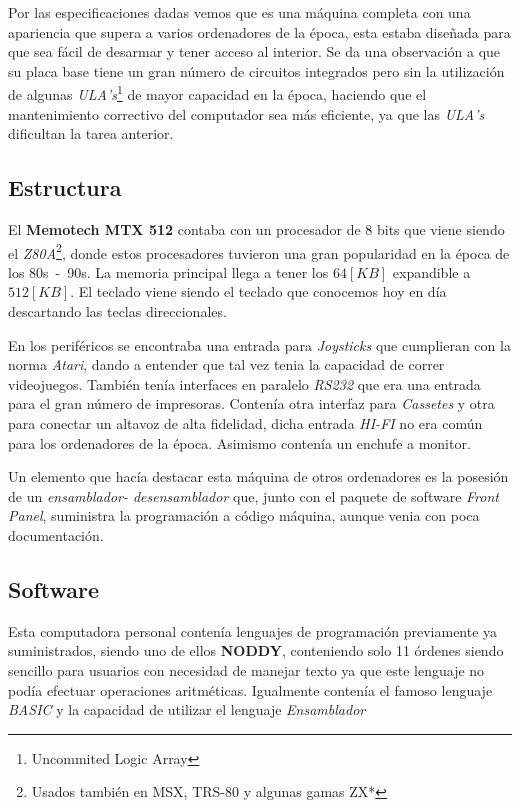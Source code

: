 \documentclass{article}
\begin{document}
\begin{multicols}{2}
Por las especificaciones dadas vemos que es una máquina completa con una apariencia que supera a varios
ordenadores de la época, esta estaba diseñada para que sea fácil de desarmar y tener  acceso al interior.
Se da una observación a que su placa base tiene un gran número de circuitos integrados pero sin la
utilización de algunas \textit{ULA's}\footnote{Uncommited Logic Array} de mayor capacidad en la época,
haciendo que el mantenimiento correctivo del computador sea más eficiente, ya que las \textit{ULA's}
dificultan la tarea anterior.

\subsection{Estructura}

El \textbf{Memotech MTX 512} contaba con un procesador de 8 bits que viene siendo el
\textit{Z80A}\footnote{Usados también en MSX, TRS-80 y algunas gamas ZX*}, donde estos procesadores
tuvieron una gran popularidad en la época de los 80s\ -\ 90s. La memoria principal llega a tener los $64 [KB]$
expandible a $512 [KB]$. El teclado viene siendo el teclado que conocemos hoy en día descartando las teclas
direccionales.

En los periféricos se encontraba una entrada para \textit{Joysticks} que cumplieran con la norma
\textit{Atari}, dando a entender que tal vez tenia la capacidad de correr videojuegos. También tenía interfaces
en paralelo \textit{RS232} que era una entrada para el gran número de impresoras.
Contenía otra interfaz para \textit{Cassetes} y otra para conectar un altavoz de alta fidelidad,
dicha entrada \textit{HI-FI} no era común para los ordenadores de la época. Asimismo contenía un enchufe
a monitor.

Un elemento que hacía destacar esta máquina de otros ordenadores es la posesión de un \textit{ensamblador-
  desensamblador}\label{asm} que, junto con el paquete de software \textit{Front Panel}, suministra la programación a
código máquina, aunque venia con poca documentación.

\subsection{Software}

Esta computadora personal contenía lenguajes de programación previamente ya suministrados, siendo uno de
ellos \textbf{NODDY}, conteniendo solo 11 órdenes siendo sencillo para usuarios con necesidad de manejar texto
ya que este lenguaje no podía efectuar operaciones aritméticas. Igualmente contenía el famoso lenguaje
\textit{BASIC} y la capacidad de utilizar el lenguaje \textit{Ensamblador}\label{asm}


\end{multicols}
\end{document}
